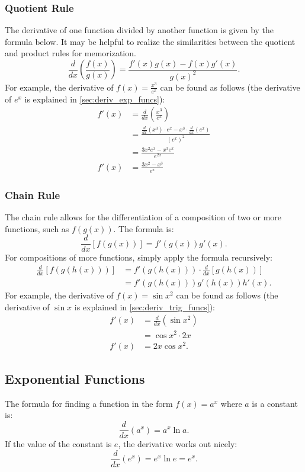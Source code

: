 \documentclass[12pt]{article}
\begin{document}
\subsubsection{Quotient Rule}
The derivative of one function divided by another function is given by the formula below. It may be helpful to realize the similarities between the quotient and product rules for memorization.
\[ \frac{d}{dx} \left( \frac{f(x)}{g(x)} \right) = \frac{f'(x) g(x) - f(x) g'(x)}{g(x)^2}. \]
For example, the derivative of $f(x) = \frac{x^3}{e^x}$ can be found as follows (the derivative of $e^x$ is explained in \autoref{sec:deriv_exp_funcs}):
\begin{align*}
	f'(x) &= \frac{d}{dx} \left( \frac{x^3}{e^x} \right) \\[5pt]
	&= \frac{\frac{d}{dx} \left( x^3 \right) \cdot e^x - x^3 \cdot \frac{d}{dx} \left( e^x \right)}{\left( e^x \right)^2} \\[5pt]
	&= \frac{3x^2 e^x - x^3 e^x}{e^{2x}} \\[5pt]
	f'(x) &= \frac{3x^2 - x^3}{e^x}
\end{align*}

\subsubsection{Chain Rule}
The chain rule allows for the differentiation of a composition of two or more functions, such as $f(g(x))$. The formula is:
\[ \frac{d}{dx} \left[ f(g(x)) \right] = f'(g(x)) g'(x). \]
For compositions of more functions, simply apply the formula recursively:
\begin{align*}
	\frac{d}{dx} \left[ f(g(h(x))) \right] &= f'(g(h(x))) \cdot \frac{d}{dx} \left[ g(h(x)) \right] \\
	&= f'(g(h(x))) g'(h(x)) h'(x).
\end{align*}
For example, the derivative of $f(x) = \sin x^2$ can be found as follows (the derivative of $\sin x$ is explained in \autoref{sec:deriv_trig_funcs}):
\begin{align*}
	f'(x) &= \frac{d}{dx} \left( \sin x^2 \right) \\[5pt]
	&= \cos x^2 \cdot 2x \\
	f'(x) &= 2x \cos x^2.
\end{align*}

\subsection{Exponential Functions}
\label{sec:deriv_exp_funcs}
The formula for finding a function in the form $f(x) = a^x$ where $a$ is a constant is:
\[ \frac{d}{dx} (a^x) = a^x \ln a. \]
If the value of the constant is $e$, the derivative works out nicely:
\[ \frac{d}{dx} (e^x) = e^x \ln e = e^x. \]
\end{document}
